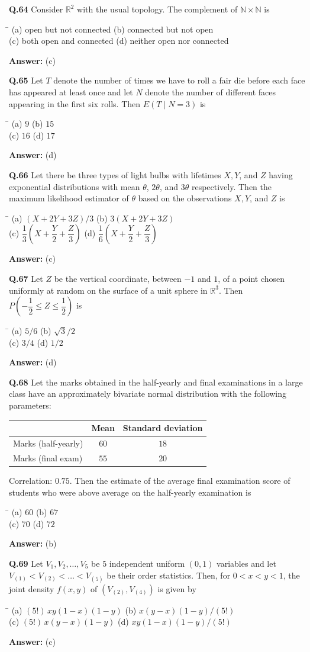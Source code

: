 \documentclass[11pt,a4paper]{article}
\newcommand{\optsfour}[4]{%
  \begin{tabbing}
    \hspace{0.48\linewidth}\=\kill
    (a) #1 \> (b) #2 \\[2pt]
    (c) #3 \> (d) #4
  \end{tabbing}%
}
\newcommand{\ans}[1]{\textbf{Answer:} #1\par\medskip}
\begin{document}
\textbf{Q.64} Consider $\mathbb{R}^2$ with the usual topology. The complement of $\mathbb{N} \times \mathbb{N}$ is
\optsfour{open but not connected}{connected but not open}{both open and connected}{neither open nor connected}
\ans{(c)}

\textbf{Q.65} Let $T$ denote the number of times we have to roll a fair die before each face has appeared at least once and let $N$ denote the number of different faces appearing in the first six rolls. Then $E(T \mid N = 3)$ is
\optsfour{$9$}{$15$}{$16$}{$17$}
\ans{(d)}

\textbf{Q.66} Let there be three types of light bulbs with lifetimes $X, Y$, and $Z$ having exponential distributions with mean $\theta$, $2\theta$, and $3\theta$ respectively. Then the maximum likelihood estimator of $\theta$ based on the observations $X, Y$, and $Z$ is
\optsfour{$(X + 2Y + 3Z)/3$}{$3(X + 2Y + 3Z)$}{$\dfrac{1}{3}\!\left(X + \dfrac{Y}{2} + \dfrac{Z}{3}\right)$}{$\dfrac{1}{6}\!\left(X + \dfrac{Y}{2} + \dfrac{Z}{3}\right)$}
\ans{(c)}

\textbf{Q.67} Let $Z$ be the vertical coordinate, between $-1$ and $1$, of a point chosen uniformly at random on the surface of a unit sphere in $\mathbb{R}^3$. Then $P\!\left(-\dfrac{1}{2} \le Z \le \dfrac{1}{2}\right)$ is
\optsfour{$5/6$}{$\sqrt{3}/2$}{$3/4$}{$1/2$}
\ans{(d)}

\textbf{Q.68} Let the marks obtained in the half-yearly and final examinations in a large class have an approximately bivariate normal distribution with the following parameters:
\begin{center}
\begin{tabular}{lcc}
  \toprule
  & Mean & Standard deviation \\
  \midrule
  Marks (half-yearly) & $60$ & $18$ \\
  Marks (final exam) & $55$ & $20$ \\
  \bottomrule
\end{tabular}
\end{center}
Correlation: $0.75$. Then the estimate of the average final examination score of students who were above average on the half-yearly examination is
\optsfour{$60$}{$67$}{$70$}{$72$}
\ans{(b)}

\textbf{Q.69} Let $V_1, V_2, \dots, V_5$ be $5$ independent uniform $(0, 1)$ variables and let $V_{(1)} < V_{(2)} < \dots < V_{(5)}$ be their order statistics. Then, for $0 < x < y < 1$, the joint density $f(x, y)$ of $(V_{(2)}, V_{(4)})$ is given by
\optsfour{$(5!)\,xy(1 - x)(1 - y)$}{$x(y - x)(1 - y)/(5!)$}{$(5!)\,x(y - x)(1 - y)$}{$xy(1 - x)(1 - y)/(5!)$}
\ans{(c)}
\end{document}
